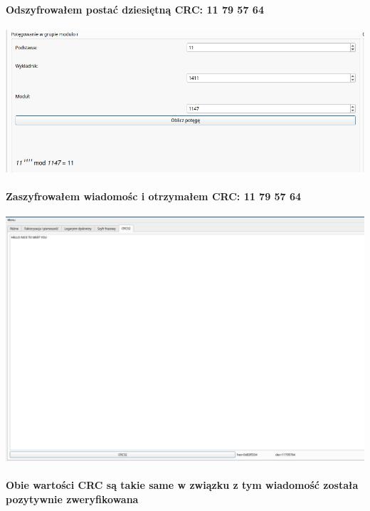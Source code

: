 \documentclass{article}[12pt]
\begin{document}
\paragraph{Odszyfrowałem postać dziesiętną CRC: 11 79 57 64 \\}
\includegraphics[width=1\textwidth]{twentyone.png} 
\paragraph{Zaszyfrowałem wiadomośc i otrzymałem CRC: 11 79 57 64 \\}
\includegraphics[width=1\textwidth]{twentytwo.png} 
\paragraph{Obie wartości CRC są takie same w związku z tym wiadomość została pozytywnie zweryfikowana}  
\end{document}
